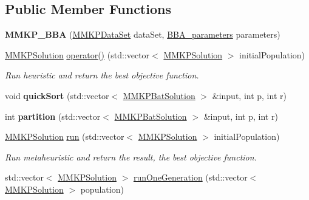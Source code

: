 \subsection*{Public Member Functions}
\begin{DoxyCompactItemize}
\item 
\hypertarget{class_m_m_k_p___b_b_a_a7599754269f5a07bcecc2c236ffe036a}{{\bfseries M\+M\+K\+P\+\_\+\+B\+B\+A} (\hyperlink{class_m_m_k_p_data_set}{M\+M\+K\+P\+Data\+Set} data\+Set, \hyperlink{class_b_b_a__parameters}{B\+B\+A\+\_\+parameters} parameters)}\label{class_m_m_k_p___b_b_a_a7599754269f5a07bcecc2c236ffe036a}

\item 
\hyperlink{class_m_m_k_p_solution}{M\+M\+K\+P\+Solution} \hyperlink{class_m_m_k_p___b_b_a_ab38c1d657ea8308b3636be53f46644d8}{operator()} (std\+::vector$<$ \hyperlink{class_m_m_k_p_solution}{M\+M\+K\+P\+Solution} $>$ initial\+Population)
\begin{DoxyCompactList}\small\item\em Run heuristic and return the best objective function. \end{DoxyCompactList}\item 
\hypertarget{class_m_m_k_p___b_b_a_ad03dd7cae1bef7d453ce6a3d14cbc58a}{void {\bfseries quick\+Sort} (std\+::vector$<$ \hyperlink{struct_m_m_k_p_bat_solution}{M\+M\+K\+P\+Bat\+Solution} $>$ \&input, int p, int r)}\label{class_m_m_k_p___b_b_a_ad03dd7cae1bef7d453ce6a3d14cbc58a}

\item 
\hypertarget{class_m_m_k_p___b_b_a_abb35fef62407d45a60e91c9b83c73cb3}{int {\bfseries partition} (std\+::vector$<$ \hyperlink{struct_m_m_k_p_bat_solution}{M\+M\+K\+P\+Bat\+Solution} $>$ \&input, int p, int r)}\label{class_m_m_k_p___b_b_a_abb35fef62407d45a60e91c9b83c73cb3}

\item 
\hypertarget{class_m_m_k_p___b_b_a_af39d657752bd2443a11695d6728871b5}{\hyperlink{class_m_m_k_p_solution}{M\+M\+K\+P\+Solution} \hyperlink{class_m_m_k_p___b_b_a_af39d657752bd2443a11695d6728871b5}{run} (std\+::vector$<$ \hyperlink{class_m_m_k_p_solution}{M\+M\+K\+P\+Solution} $>$ initial\+Population)}\label{class_m_m_k_p___b_b_a_af39d657752bd2443a11695d6728871b5}

\begin{DoxyCompactList}\small\item\em Run metaheuristic and return the result, the best objective function. \end{DoxyCompactList}\item 
\hypertarget{class_m_m_k_p___b_b_a_ac5ecabe29a6727328eee8b4899ae5b77}{std\+::vector$<$ \hyperlink{class_m_m_k_p_solution}{M\+M\+K\+P\+Solution} $>$ \hyperlink{class_m_m_k_p___b_b_a_ac5ecabe29a6727328eee8b4899ae5b77}{run\+One\+Generation} (std\+::vector$<$ \hyperlink{class_m_m_k_p_solution}{M\+M\+K\+P\+Solution} $>$ population)}\label{class_m_m_k_p___b_b_a_ac5ecabe29a6727328eee8b4899ae5b77}


\end{DoxyCompactItemize}
